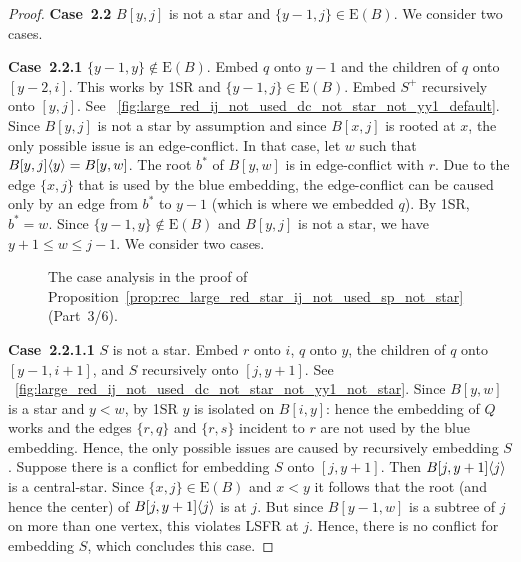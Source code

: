 \documentclass[11pt,a4paper,colorlinks=true,urlcolor=blue,citecolor=red]{article}
\theoremstyle{plain}
\newcommand{\case}[1]{\par\vspace{.5\baselineskip}\noindent\textbf{\sffamily Case~#1}}
\newcommand{\EB}{\mathrm{E}(B)}
\begin{document}
\begin{proof}
  \case{2.2} $B[y,j]$ is not a star and $\{y-1,j\}\in\EB$. We
  consider two cases.

  \case{2.2.1} $\{y-1,y\}\not\in\EB$. Embed $q$ onto $y-1$ and
  the children of $q$ onto $[y-2,i]$. This works by 1SR and
  $\{y-1,j\}\in\EB$. Embed $S^+$ recursively onto $[y,j]$. See
  \figurename~\ref{fig:large_red_ij_not_used_dc_not_star_not_yy1_default}.
  Since $B[y,j]$ is not a star by assumption and since $B[x,j]$ is
  rooted at $x$, the only possible issue is an edge-conflict. In
  that case, let $w$ such that $B{[y,j]}\langle{y}\rangle=B[y,w]$. The root
  $b^*$ of $B[y,w]$ is in edge-conflict with $r$. Due to the edge
  $\{x,j\}$ that is used by the blue embedding, the edge-conflict can be
  caused only by an edge from $b^*$ to $y-1$ (which is where we embedded
  $q$). By 1SR, $b^*=w$. Since $\{y-1,y\}\not\in\EB$ and $B[y,j]$ is not
  a star, we have $y+1\leq w\leq j-1$. We consider two cases.

  \begin{figure}[b]
    \centering\hfil {}\hfil {}\hfil {}\hfil {}\hfil \caption{The case analysis in the proof of
      Proposition~\ref{prop:rec_large_red_star_ij_not_used_sp_not_star}~(Part~3/6).}
  \end{figure}

  \case{2.2.1.1} $S$ is not a star. Embed $r$ onto $i$, $q$ onto $y$,
  the children of $q$ onto $[y-1,i+1]$, and $S$ recursively onto
  $[j,y+1]$. See
  \figurename~\ref{fig:large_red_ij_not_used_dc_not_star_not_yy1_not_star}.
  Since $B[y,w]$ is a star and $y<w$, by 1SR $y$ is isolated on
  $B[i,y]$: hence the embedding of $Q$ works and the edges $\{r,q\}$ and
  $\{r,s\}$ incident to $r$ are not used by the blue embedding. Hence,
  the only possible issues are caused by recursively embedding $S$.
  Suppose there is a conflict for embedding $S$ onto $[j,y+1]$.
  Then $B{[j,y+1]}\langle{j}\rangle$ is a central-star. Since
  $\{x,j\}\in\EB$ and $x<y$ it follows that the root (and hence the
  center) of $B{[j,y+1]}\langle{j}\rangle$ is at $j$. But since $B[y-1,w]$ is a
  subtree of $j$ on more than one vertex, this violates LSFR at $j$.
  Hence, there is no conflict for embedding $S$, which concludes
  this case.


\end{proof}
\end{document}
